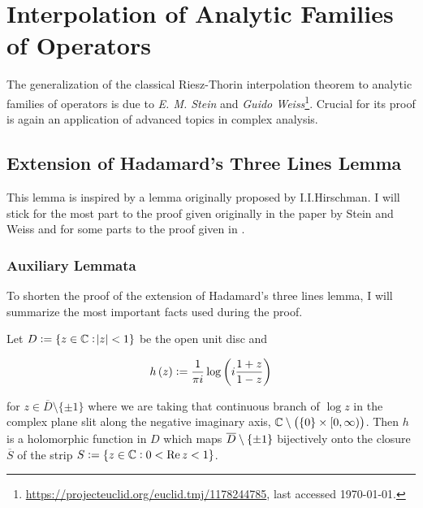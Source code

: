 \section{Interpolation of Analytic Families of Operators}
The generalization of the classical Riesz-Thorin interpolation theorem to analytic families of operators is due to \emph{E. M. Stein} and \emph{Guido  Weiss}\footnote{\href{https://projecteuclid.org/euclid.tmj/1178244785}{https://projecteuclid.org/euclid.tmj/1178244785}, last accessed \today.}. Crucial for its proof is again an application of advanced topics in complex analysis.

\subsection{Extension of Hadamard's Three Lines Lemma}
This lemma is inspired by a lemma originally proposed by I.I.Hirschman. I will stick for the most part to the proof given originally in the paper by Stein and Weiss and for some parts to the proof given in \cite[43--45]{grafakos:fourier:2014}.

\subsubsection{Auxiliary Lemmata} To shorten the proof of the extension of Hadamard's three lines lemma, I will summarize the most important facts used during the proof.

\begin{lemma}
	Let $D := \cbr[0]{z \in \mathbb{C} : \abs{z} < 1}$ be the open unit disc and 
	
	\begin{equation*}
		h\del{z} := \frac{1}{\pi i}\log\del{i\frac{1 + z}{1 - z}}
	\end{equation*}

	for $z \in \overline{D} \setminus \{\pm 1\}$ where we are taking that continuous branch of $\log z$ in the complex plane slit along the negative imaginary axis, $\mathbb{C} \setminus \del{\cbr{0} \times \intco{0,\infty}}$. Then $h$ is a holomorphic function in $D$ which maps $\overline{D}\setminus \cbr{\pm 1}$ bijectively onto the closure $\overline{S}$ of the strip $S := \cbr{z \in \mathbb{C} : 0 < \Re z < 1}$.
	\label{lem:h}
\end{lemma}

